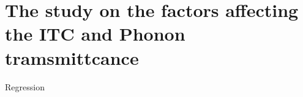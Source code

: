 
\chapter[Figure out the physics: the regression method]{The study on the factors affecting the ITC and Phonon tramsmittcance}  %

\graphicspath{{Chapter5/}}



Regression